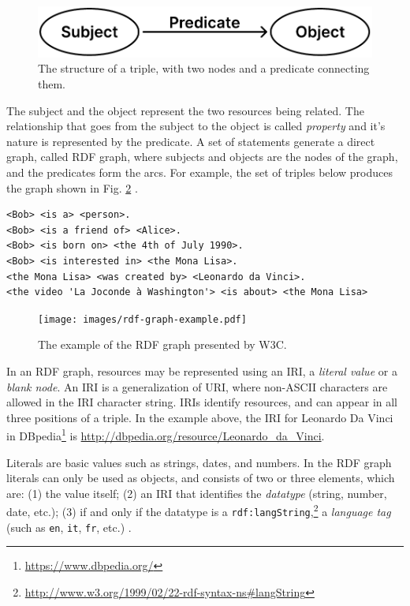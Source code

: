 \begin{figure}[!ht]
    \centering
    \includegraphics[width=0.55\columnwidth]{images/rdf-graph-structure.pdf}
    \caption{The structure of a triple, with two nodes and a predicate connecting them.}
    \label{fig:rdf-graph-structure}
\end{figure}

The subject and the object represent the two resources being related. The relationship that goes from the subject to the object is called \textit{property} and it's nature is represented by the predicate. A set of statements generate a direct graph, called RDF graph, where subjects and objects are the nodes of the graph, and the predicates form the arcs. For example, the set of triples below produces the graph shown in Fig. \ref{fig:rdf-graph-examle} \cite{world2014rdfprimer}.

\begin{verbatim}
<Bob> <is a> <person>.
<Bob> <is a friend of> <Alice>.
<Bob> <is born on> <the 4th of July 1990>.
<Bob> <is interested in> <the Mona Lisa>.
<the Mona Lisa> <was created by> <Leonardo da Vinci>.
<the video 'La Joconde à Washington'> <is about> <the Mona Lisa>
\end{verbatim}

\begin{figure}[!ht]
    \centering
    \texttt{[image: images/rdf-graph-example.pdf]}
    \caption{The example of the \ac{RDF} graph presented by \ac{W3C}.}
    \label{fig:rdf-graph-examle}
\end{figure}

In an \ac{RDF} graph, resources may be represented using an \ac{IRI}, a \textit{literal value} or a \textit{blank node}. An \ac{IRI} is a generalization of \ac{URI}, where non-\acs{ASCII} characters are allowed in the \ac{IRI} character string. \acp{IRI} identify resources, and can appear in all three positions of a triple. In the example above, the \ac{IRI} for Leonardo Da Vinci in DBpedia\footnote{\url{https://www.dbpedia.org/}} is \url{http://dbpedia.org/resource/Leonardo_da_Vinci}.

Literals are basic values such as strings, dates, and numbers. In the \ac{RDF} graph literals can only be used as objects, and consists of two or three elements, which are: (1) the value itself; (2) an \ac{IRI} that identifies the \textit{datatype} (string, number, date, etc.); (3) if and only if the datatype is a \texttt{rdf:langString},\footnote{\url{http://www.w3.org/1999/02/22-rdf-syntax-ns\#langString}} a \textit{language tag} (such as \texttt{en}, \texttt{it}, \texttt{fr}, etc.) \cite{world2014rdfconcepts}.

